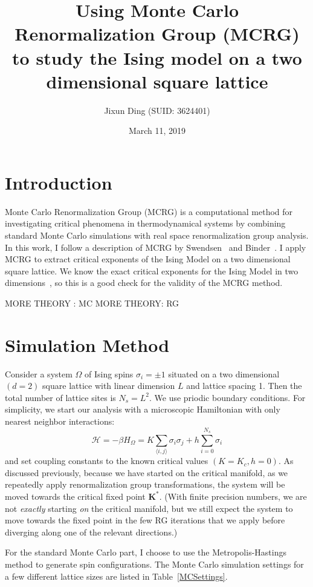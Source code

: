 \documentclass{article}
\title{Using Monte Carlo Renormalization Group (MCRG) to study the Ising model on a two dimensional square lattice}
\author{Jixun Ding (SUID: 3624401)}
\date{March 11, 2019}
\renewcommand{\vec}[1]{\mathbf{#1}}
\begin{document}
\maketitle
\section{Introduction}
Monte Carlo Renormalization Group (MCRG) is a computational method for investigating critical phenomena in thermodynamical systems by combining
standard Monte Carlo simulations with real space renormalization
group analysis. In this work, I follow a description of MCRG by Swendsen~\cite{SwendsenDetail} and Binder~\cite{Binder2014}. I apply MCRG to extract critical exponents of the Ising Model on a two dimensional square lattice. We know the exact critical exponents for the Ising Model in two dimensions~\cite{Onsager1944}, so this is a good check for the validity of the MCRG method.

MORE THEORY : MC
MORE THEORY: RG

\section{Simulation Method}
Consider a system $\Omega$ of Ising spins $\sigma_i = \pm 1$ situated on a two dimensional $(d = 2)$ square lattice with linear dimension $L$ and lattice spacing 1. Then the total number of lattice sites is $N_s = L^2$. We use priodic boundary conditions. For simplicity, we start our analysis with a microscopic Hamiltonian with only nearest neighbor interactions:
\begin{equation*}
\mathcal{H} = -\beta H_\Omega = K\sum_{\langle i,j\rangle} \sigma_i \sigma_j + h\sum_{i = 0}^{N_s} \sigma_i
\end{equation*}
and set coupling constants to the known critical values $(K = K_c, h = 0)$. As discussed previously, because we have started on the critical manifold, as we repeatedly apply renormalization group transformations, the system will be moved towards the critical fixed point $\vec{K^*}$. (With finite precision numbers, we are not \textit{exactly} starting \textit{on} the critical manifold, but we still expect the system to move towards the fixed point in the few RG iterations that we apply before diverging along one of the relevant directions.)

For the standard Monte Carlo part, I choose to use the Metropolis-Hastings method to generate spin configurations. The Monte Carlo simulation settings for a few different lattice sizes are listed in Table~\ref{MCSettings}.
\end{document}
